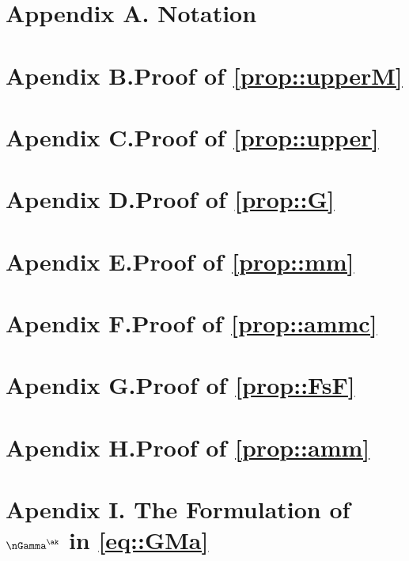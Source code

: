\newpage
\section*{Appendix A.\;\; Notation}\label{appendix::A}


\section*{Apendix B.\;\;Proof of \cref{prop::upperM}}\label{appendix::B}


\section*{Apendix C.\;\;Proof of \cref{prop::upper}}\label{appendix::C}


\section*{Apendix D.\;\;Proof of \cref{prop::G}}\label{appendix::D}


\section*{Apendix E.\;\;Proof of \cref{prop::mm}}\label{appendix::E}


\section*{Apendix F.\;\;Proof of \cref{prop::ammc}}\label{appendix::F}


\section*{Apendix G.\;\;Proof of \cref{prop::FsF}}\label{appendix::G}


\section*{Apendix H.\;\;Proof of \cref{prop::amm}}\label{appendix::H}



\section*{Apendix I.\;\; The Formulation of $\nGamma^{\ak}$ in \cref{eq::GMa}}\label{appendix::I}


